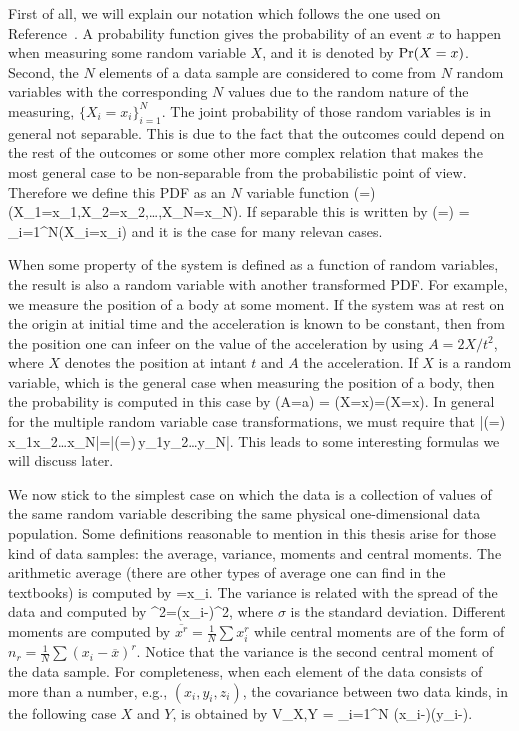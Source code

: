 First of all, we will explain our notation which follows the one used on Reference~\citep{Riley1998}.
A probability function gives the probability of an event $x$ to happen when measuring some random variable $X$, and it is denoted by $\text{Pr}(X=x)$.
Second, the $N$ elements of a data sample are considered to come from $N$ random variables with the corresponding $N$ values due to the random nature of the measuring, $\{X_i=x_i\}_{i=1}^N$.
The joint probability of those random variables is in general not separable.
This is due to the fact that the outcomes could depend on the rest of the outcomes or some other more complex relation that makes the most general case to be non-separable from the probabilistic point of view.
Therefore we define this PDF as an $N$ variable function
\be
  \prob(=) \equiv \prob(X_1=x_1,X_2=x_2,\dots,X_N=x_N).
\ee
If separable this is written by
\be
  \prob(=) = \prod_{i=1}^N\prob(X_i=x_i)
\ee
and it is the case for many relevan cases.

When some property of the system is defined as a function of random variables, the result is also a random variable with another transformed PDF.
For example, we measure the position of a body at some moment.
If the system was at rest on the origin at initial time and the acceleration is known to be constant, then from the position one can infeer on the value of the acceleration by using $A=2X/t^2$, where $X$ denotes the position at intant $t$ and $A$ the acceleration.
If $X$ is a random variable, which is the general case when measuring the position of a body, then the probability is computed in this case by
\be
  \prob(A=a) = \prob(X=x)=\prob(X=x).
\ee
In general for the multiple random variable case transformations, we must require that
\be
  |\prob(=)\,x_1x_2\dots{}x_N|=|\prob(=)\,y_1y_2\dots{}y_N|.
\ee
This leads to some interesting formulas we will discuss later.

We now stick to the simplest case on which the data is a collection of values of the same random variable describing the same physical one-dimensional data population.
Some definitions reasonable to mention in this thesis arise for those kind of data samples: the average, variance, moments and central moments.
The arithmetic average (there are other types of average one can find in the textbooks) is computed by
\be
  =\sum x_i.
\ee
The variance is related with the spread of the data and computed by
\be
  \sigma^2=\sum (x_i-)^2,
\ee
where $\sigma$ is the standard deviation.
Different moments are computed by $\overline{x^r}=\frac{1}{N}\sum x_i^r$ while central moments are of the form of $n_r=\frac{1}{N}\sum (x_i-\overline{x})^r$.
Notice that the variance is the second central moment of the data sample.
For completeness, when each element of the data consists of more than a number, e.g., $(x_i,y_i,z_i)$, the covariance between two data kinds, in the following case $X$ and $Y$, is obtained by
\be
  V_{X,Y} = \sum_{i=1}^N (x_i-)(y_i-).
\ee

